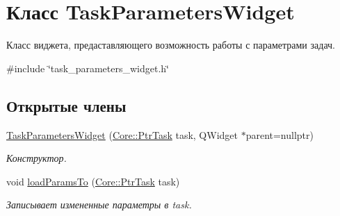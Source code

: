 \hypertarget{class_task_parameters_widget}{}\section{Класс Task\+Parameters\+Widget}
\label{class_task_parameters_widget}


Класс виджета, предаставляющего возможность работы с параметрами задач.  




{\ttfamily \#include \char`\"{}task\+\_\+parameters\+\_\+widget.\+h\char`\"{}}

\subsection*{Открытые члены}
\begin{DoxyCompactItemize}
\item 
\hypertarget{class_task_parameters_widget_af744e624424645246d77dfde391868a3}{}\label{class_task_parameters_widget_af744e624424645246d77dfde391868a3} 
\hyperlink{class_task_parameters_widget_af744e624424645246d77dfde391868a3}{Task\+Parameters\+Widget} (\hyperlink{namespace_core_abfda8f69fcacfcea2696549b548ed737}{Core\+::\+Ptr\+Task} task, Q\+Widget $\ast$parent=nullptr)
\begin{DoxyCompactList}\small\item\em Конструктор. \end{DoxyCompactList}\item 
\hypertarget{class_task_parameters_widget_a0ea478c1087cbeed8880a07c382d6667}{}\label{class_task_parameters_widget_a0ea478c1087cbeed8880a07c382d6667} 
void \hyperlink{class_task_parameters_widget_a0ea478c1087cbeed8880a07c382d6667}{load\+Params\+To} (\hyperlink{namespace_core_abfda8f69fcacfcea2696549b548ed737}{Core\+::\+Ptr\+Task} task)
\begin{DoxyCompactList}\small\item\em Записывает измененные параметры в task. \end{DoxyCompactList}\end{DoxyCompactItemize}
